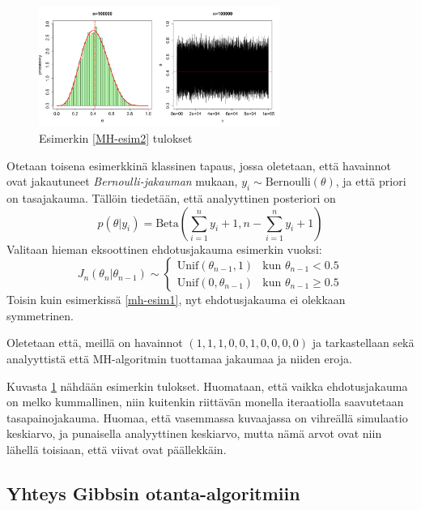 \begin{esim}\label{MH-esim2}
	\begin{figure}[h!]
		\includegraphics[width=0.7\textwidth]{mhexample2}
		\caption[Yksiulotteinen Metropolis--Hastings esimerkki]{Esimerkin \ref{MH-esim2} tulokset}
		\label{kuva2}
	\end{figure}
	Otetaan toisena esimerkkinä klassinen tapaus, jossa oletetaan, että havainnot ovat jakautuneet \textit{Bernoulli-jakauman} mukaan, 
	$y_i \sim \mathrm{Bernoulli}(\theta)$, 
	ja että priori on tasajakauma. Tällöin tiedetään, että analyyttinen posteriori on 
	\begin{equation*}
		p(\theta|y_i) = \mathrm{Beta}(\sum_{i=1}^{n} y_i+1, n - \sum_{i=1}^{n} y_i+1)
	\end{equation*}
	Valitaan hieman eksoottinen ehdotusjakauma esimerkin vuoksi:
	\begin{equation}
		J_n(\theta_n|\theta_{n-1}) \sim \begin{cases}
			\mathrm{Unif}(\theta_{n-1},1) & \text{kun } \theta_{n-1}<0.5 \\
			\mathrm{Unif}(0,\theta_{n-1}) & \text{kun } \theta_{n-1}\geq0.5
		\end{cases}
	\end{equation}
	Toisin kuin esimerkissä \ref{mh-esim1}, nyt ehdotusjakauma ei olekkaan symmetrinen.
	
	Oletetaan että, meillä on havainnot $(1,1,1,0,0,1,0,0,0,0)$ ja tarkastellaan sekä analyyttistä että MH-algoritmin tuottamaa jakaumaa ja niiden eroja.

	Kuvasta \ref{kuva2} nähdään esimerkin tulokset. Huomataan, että vaikka ehdotusjakauma on melko kummallinen, niin kuitenkin riittävän monella iteraatiolla saavutetaan tasapainojakauma. Huomaa, että vasemmassa kuvaajassa on vihreällä simulaatio keskiarvo, ja punaisella analyyttinen keskiarvo, mutta nämä arvot ovat niin lähellä toisiaan, että viivat ovat päällekkäin.
\end{esim}

\subsection{Yhteys Gibbsin otanta-algoritmiin}


